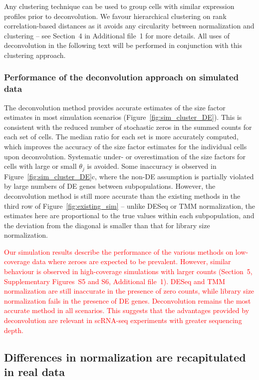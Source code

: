 \documentclass{bmcart}
\newcommand{\suppclustering}{4}
\newcommand{\supphighcov}{5}
\newcommand{\supphighcovex}{S5}
\newcommand{\supphighcovde}{S6}
\newcommand{\revised}[1]{\textcolor{red}{#1}}
\begin{document}
Any clustering technique can be used to group cells with similar expression profiles prior to deconvolution.
We favour hierarchical clustering on rank correlation-based distances as it avoids any circularity between normalization and clustering
    -- see Section~\suppclustering{} in Additional file~1 for more details.
All uses of deconvolution in the following text will be performed in conjunction with this clustering approach.

\subsubsection*{Performance of the deconvolution approach on simulated data}
The deconvolution method provides accurate estimates of the size factor estimates in most simulation scenarios (Figure~\ref{fig:sim_cluster_DE}).
This is consistent with the reduced number of stochastic zeros in the summed counts for each set of cells.
The median ratio for each set is more accurately computed, which improves the accuracy of the size factor estimates for the individual cells upon deconvolution.
Systematic under- or overestimation of the size factors for cells with large or small $\theta_j$ is avoided.
Some inaccuracy is observed in Figure~\ref{fig:sim_cluster_DE}c, where the non-DE assumption is partially violated by large numbers of DE genes between subpopulations.
However, the deconvolution method is still more accurate than the existing methods in the third row of Figure~\ref{fig:existing_sim}
    -- unlike DESeq or TMM normalization, the estimates here are proportional to the true values within each subpopulation, 
       and the deviation from the diagonal is smaller than that for library size normalization.

\revised{Our simulation results describe the performance of the various methods on low-coverage data where zeroes are expected to be prevalent.
However, similar behaviour is observed in high-coverage simulations with larger counts (Section~\supphighcov{}, Supplementary Figures~\supphighcovex{} and \supphighcovde{}, Additional file~1).
DESeq and TMM normalization are still inaccurate in the presence of zero counts, while library size normalization fails in the presence of DE genes.
Deconvolution remains the most accurate method in all scenarios.
This suggests that the advantages provided by deconvolution are relevant in scRNA-seq experiments with greater sequencing depth.}

\subsection*{Differences in normalization are recapitulated in real data}
\end{document}
